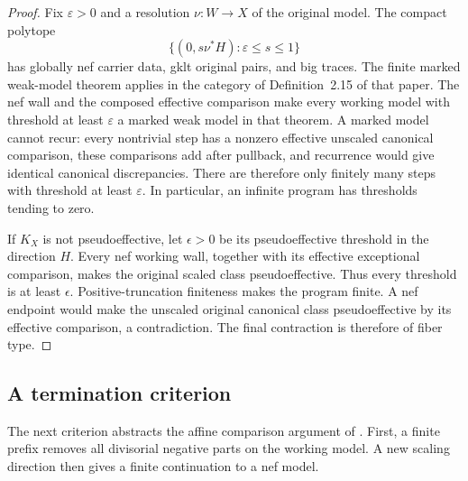 \documentclass[11pt,a4paper]{article}
\numberwithin{equation}{section}
\theoremstyle{definition}
\theoremstyle{remark}
\begin{document}
\begin{proof}
Fix $\varepsilon>0$ and a resolution $\nu:W\to X$ of the
original model. The compact polytope
\[
 \{(0,s\nu^*H):\varepsilon\le s\le1\}
\]
has globally nef carrier data, gklt original pairs, and big traces.
The finite marked weak-model theorem
\cite[Theorem~5.15(2)]{HX2026} applies in the category of
Definition~2.15 of that paper. The nef wall and the composed effective comparison make every
working model with threshold at least $\varepsilon$ a marked weak
model in that theorem. A marked model cannot recur:
every nontrivial step has a nonzero effective unscaled canonical
comparison, these comparisons add after pullback, and recurrence
would give identical canonical discrepancies. There are therefore only finitely many steps with threshold at
least $\varepsilon$. In particular, an infinite program has
thresholds tending to zero.

If $K_X$ is not pseudoeffective, let $\epsilon>0$ be its
pseudoeffective threshold in the direction $H$. Every nef working wall, together with its effective
exceptional comparison, makes the original scaled class
pseudoeffective. Thus every threshold is at least $\epsilon$.
Positive-truncation finiteness makes the program finite. A nef
endpoint would make the unscaled original canonical class
pseudoeffective by its effective comparison, a contradiction.
The final contraction is therefore of fiber type.
\end{proof}

\subsection{A termination criterion}

The next criterion abstracts the affine comparison argument of
\cite[proof of Theorem~3.13]{OAI034}. First, a finite prefix
removes all divisorial negative parts on the working model. A new
scaling direction then gives a finite continuation to a nef model.
\end{document}
